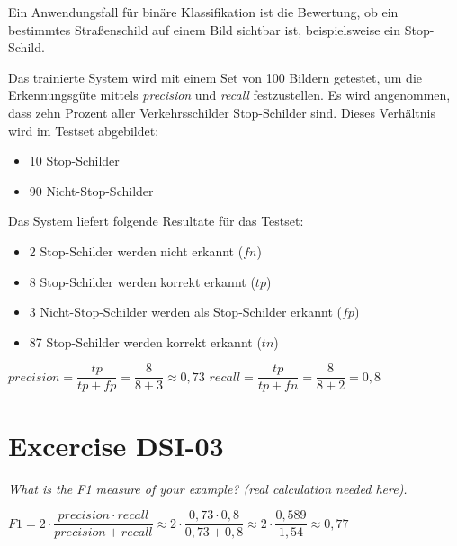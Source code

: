 \documentclass[11pt,a4paper]{article}
\begin{document}
Ein Anwendungsfall für binäre Klassifikation ist die Bewertung, ob ein bestimmtes Straßenschild auf einem Bild sichtbar ist, beispielsweise ein Stop-Schild.

Das trainierte System wird mit einem Set von 100 Bildern getestet, um die Erkennungsgüte mittels \emph{precision} und \emph{recall} festzustellen. Es wird angenommen, dass zehn Prozent aller Verkehrsschilder Stop-Schilder sind. Dieses Verhältnis wird im Testset abgebildet:
\begin{itemize}
	\item 10 Stop-Schilder
	\item 90 Nicht-Stop-Schilder
\end{itemize}

Das System liefert folgende Resultate für das Testset:

\begin{itemize}
	\item 2 Stop-Schilder werden nicht erkannt ($fn$)
	\item 8 Stop-Schilder werden korrekt erkannt ($tp$)
	\item 3 Nicht-Stop-Schilder werden als Stop-Schilder erkannt ($fp$)
	\item 87 Stop-Schilder werden korrekt erkannt ($tn$)
\end{itemize}

$precision = \dfrac{tp}{tp + fp} = \dfrac{8}{8 + 3} \approx 0,73$
$recall = \dfrac{tp}{tp + fn} = \dfrac{8}{8 + 2} = 0,8 $


\section{Excercise DSI-03}
\textit{What is the F1 measure of your example? (real calculation needed here).}

$ F1 = 2 \cdot \dfrac{precision \cdot recall}{precision + recall} 
     \approx 2 \cdot \dfrac{0,73 \cdot 0,8}{0,73 + 0,8} \approx 2 \cdot \dfrac{0,589}{1,54}
     \approx 0,77$
\end{document}
